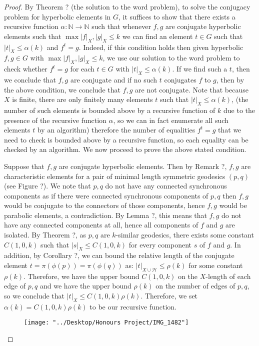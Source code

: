 \documentclass[12pt]{article}
\newcommand{\vs}{\vskip10pt}
\begin{document}
	\begin{proof}
			By Theorem ? (the solution to the word problem), to solve the conjugacy problem for hyperbolic elements in $G$, it suffices to show that there exists a recursive function $\alpha: \mathbb{N} \rightarrow \mathbb{N}$ such that whenever $f,g$ are conjugate hyperbolic elements such that $\max{ \vert f \vert_X, \vert g \vert_X} \leq k$ we can find an element $t \in G$ such that $\vert t \vert_X \leq \alpha(k)$ and $f^t = g$. Indeed, if this condition holds then given hyperbolic $f,g \in G$ with $\max{ \vert f \vert_X, \vert g \vert_X} \leq k$, we use our solution to the word problem to check whether $f^t = g$ for each $t \in G$ with $\vert t \vert_X \leq \alpha(k)$. If we find such a $t$, then we conclude that $f,g$ are conjugate and if no such $t$ conjugates $f$ to $g$, then by the above condition, we conclude that $f,g$ are not conjugate. Note that because $X$ is finite, there are only finitely many elements $t$ such that $\vert t \vert_X \leq \alpha(k)$, (the number of such elements is bounded above by a recursive function of $k$ due to the presence of the recursive function $\alpha$, so we can in fact enumerate all such elements $t$ by an algorithm) therefore the number of equalities $f^t = g$ that we need to check is bounded above by a recursive function, so each equality can be checked by an algorithm. We now proceed to prove the above stated condition. 
		
		\vs 
		
		Suppose that $f,g$ are conjugate hyperbolic elements. Then by Remark ?, $f,g$ are characteristic elements for a pair of minimal length symmetric geodesics $(p,q)$ (see Figure ?). We note that $p,q$ do not have any connected synchronous components as if there were connected synchronous components of $p,q$ then $f,g$ would be conjugate to the connectors of those components, hence $f,g$ would be parabolic elements, a contradiction. By Lemma ?, this means that $f,g$ do not have any connected components at all, hence all components of $f$ and $g$ are isolated. By Theorem ?, as $p,q$ are $k$-similar geodesics, there exists some constant $C(1,0,k)$ such that $\vert s \vert_X \leq C(1,0,k)$ for every component $s$ of $f$ and $g$. In addition, by Corollary ?, we can bound the relative length of the conjugate element $t = \pi(\phi(p)) = \pi(\phi(q))$ as: $\vert t \vert_{X \cup \mathcal{H}} \leq \rho(k)$ for some constant $\rho(k)$. Therefore, we have the upper bound $C(1,0,k)$ on the $X$-length of each edge of $p,q$ and we have the upper bound $\rho(k)$ on the number of edges of $p,q$, so we conclude that $\vert t \vert_X \leq C(1,0,k)\rho(k)$. Therefore, we set $\alpha(k) = C(1,0,k)\rho(k)$ to be our recursive function. 
		
		
\begin{figure} [h]
	\centering
	\texttt{[image: "../Desktop/Honours Project/IMG\_1482"]}
	\caption{}
	\label{fig:img1482}
\end{figure}
		
	\end{proof}
	
\end{document}
